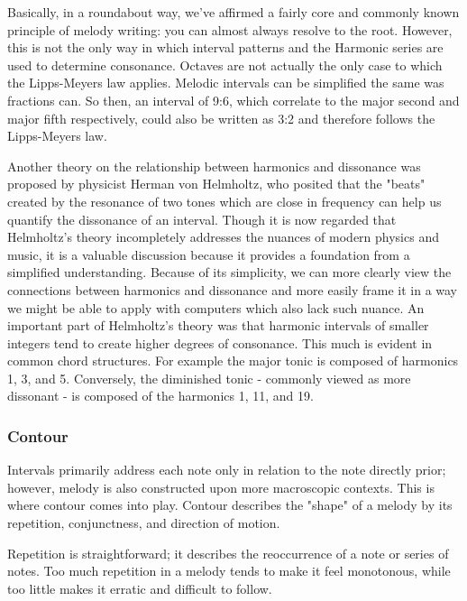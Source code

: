 Basically, in a roundabout way, we've affirmed a fairly core and commonly known principle of
melody writing: you can almost always resolve to the root. However, this is not the only way in
which interval patterns and the Harmonic series are used to determine consonance. Octaves are
not actually the only case to which the Lipps-Meyers law applies. Melodic intervals can be
simplified the same was fractions can.\autocite{intervals} So then, an interval of 9:6, which
correlate to the major second and major fifth respectively, could also be written as 3:2 and
therefore follows the Lipps-Meyers law.

Another theory on the relationship between harmonics and dissonance was proposed by physicist
Herman von Helmholtz, who posited that the "beats" created by the resonance of two tones which are
close in frequency can help us quantify the dissonance of an interval.\autocite{intervals} Though it is now regarded
that Helmholtz's theory incompletely addresses the nuances of modern physics and music, it is
a valuable discussion because it provides a foundation from a simplified understanding. Because
of its simplicity, we can more clearly view the connections between harmonics and dissonance and
more easily frame it in a way we might be able to apply with computers which also lack such nuance.
An important part of Helmholtz's theory was that harmonic intervals of smaller integers tend to
create higher degrees of consonance.\autocite{intervals} This much is evident in common chord
structures. For example the major tonic is composed of harmonics 1, 3, and 5. Conversely, the
diminished tonic - commonly viewed as more dissonant - is composed of the harmonics 1, 11, and 19.

\subsubsection{Contour}

Intervals primarily address each note only in relation to the note directly prior; however, melody
is also constructed upon more macroscopic contexts. This is where contour comes into play. Contour
describes the "shape" of a melody by its repetition, conjunctness, and direction of motion.\autocite{contour}

Repetition is straightforward; it describes the reoccurrence of a note or series of notes. Too much
repetition in a melody tends to make it feel monotonous, while too little makes it erratic and
difficult to follow.\autocite{contour}

